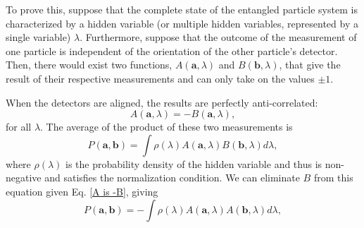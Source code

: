\documentclass[11pt,letterpaper]{article}
\begin{document}
To prove this, suppose that the complete state of the entangled particle system is characterized by a hidden variable (or multiple hidden variables, represented by a single variable) $\lambda$. Furthermore, suppose that the outcome of the measurement of one particle is independent of the orientation of the other particle's detector. Then, there would exist two functions, $A(\textbf{a}, \lambda)$ and $B(\textbf{b}, \lambda)$, that give the result of their respective measurements and can only take on the values $\pm 1$.

When the detectors are aligned, the results are perfectly anti-correlated:
\begin{equation}
    A(\textbf{a}, \lambda) = -B(\textbf{a}, \lambda) , \label{A is -B}
\end{equation}
for all $\lambda$. The average of the product of these two measurements is
\begin{equation}
    P(\textbf{a}, \textbf{b}) = \int \rho (\lambda)  A(\textbf{a}, \lambda) B(\textbf{b}, \lambda) d\lambda ,
\end{equation}
where $\rho (\lambda)$ is the probability density of the hidden variable and thus is non-negative and satisfies the normalization condition. We can eliminate $B$ from this equation given Eq. \ref{A is -B}, giving
\begin{equation}
    P(\textbf{a}, \textbf{b}) = -\int \rho (\lambda)  A(\textbf{a}, \lambda) A(\textbf{b}, \lambda) d\lambda ,
\end{equation}
\end{document}
